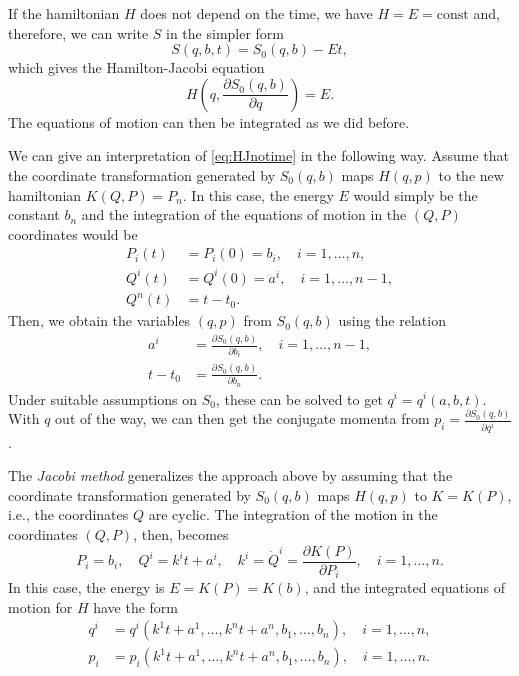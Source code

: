 \documentclass[english,fontsize=11pt,paper=b5]{scrbook}
\theoremstyle{definition}
\begin{document}
    If the hamiltonian $H$ does not depend on the time, we have $H=E=\mathrm{const}$ and, therefore, we can write $S$ in the simpler form
    \begin{equation}
      S(q,b,t) = S_0(q,b) - E t,
    \end{equation}
    which gives the Hamilton-Jacobi equation
    \begin{equation}\label{eq:HJnotime}
      H\left(q, \frac{\partial S_0(q,b)}{\partial q}\right) = E.
    \end{equation}
    The equations of motion can then be integrated as we did before.

    We can give an interpretation of \eqref{eq:HJnotime} in the following way.
    Assume that the coordinate transformation generated by $S_0(q,b)$ maps $H(q,p)$ to the new hamiltonian $K(Q,P)=P_n$.
    In this case, the energy $E$ would simply be the constant $b_n$ and the integration of the equations of motion in the $(Q,P)$ coordinates would be
    \begin{align}
      P_i(t) & = P_i(0) = b_i, \quad i=1,\ldots,n,   \\
      Q^i(t) & = Q^i(0) = a^i, \quad i=1,\ldots,n-1, \\
      Q^n(t) & = t- t_0.
    \end{align}
    Then, we obtain the variables $(q,p)$ from $S_0(q,b)$ using the relation
    \begin{align}
      a^i   & = \frac{\partial S_0(q,b)}{\partial b_i}, \quad i=1,\ldots,n-1, \\
      t-t_0 & = \frac{\partial S_0(q,b)}{\partial b_n}.
    \end{align}
    Under suitable assumptions on $S_0$, these can be solved to get $q^i = q^i(a,b,t)$. With $q$ out of the way, we can then get the conjugate momenta from $p_i = \frac{\partial S_0(q,b)}{\partial q^i}$.

    The \emph{Jacobi method} generalizes the approach above by assuming that the coordinate transformation generated by $S_0(q,b)$ maps $H(q,p)$ to $K = K(P)$, i.e., the coordinates $Q$ are cyclic.
    The integration of the motion in the coordinates $(Q,P)$, then, becomes
    \begin{equation}\label{eq:JacobiM}
      P_i = b_i, \quad
      Q^i = k^i t + a^i, \quad
      k^i = \dot Q^i = \frac{\partial K(P)}{\partial P_i}, \quad
      i = 1,\ldots,n.
    \end{equation}
    In this case, the energy is $E = K(P) = K(b)$, and the integrated equations of motion for $H$ have the form
    \begin{align}
      q^i & = q^i(k^1 t + a^1, \ldots, k^n t + a^n, b_1, \ldots, b_n), \quad i=1,\ldots,n, \\
      p_i & = p_i(k^1 t + a^1, \ldots, k^n t + a^n, b_1, \ldots, b_n), \quad i=1,\ldots,n.
    \end{align}
\end{document}
